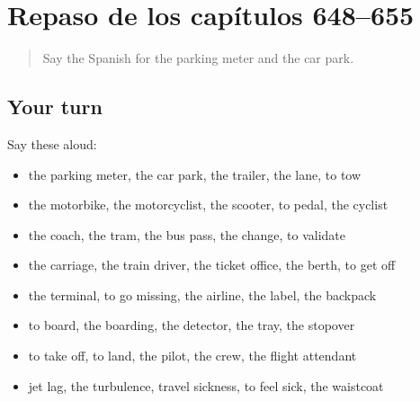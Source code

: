 \section[(dialogue)]{Repaso de los capítulos 648–655}

\label{lesson:ES-R655-repaso-648-655}



\begin{quote}
Say the Spanish for the parking meter and the car park.
\end{quote}

\subsection*{Your turn}
Say these aloud:

\begin{itemize}
\raggedright
  \item the parking meter, the car park, the trailer, the lane, to tow
  \item the motorbike, the motorcyclist, the scooter, to pedal, the cyclist
  \item the coach, the tram, the bus pass, the change, to validate
  \item the carriage, the train driver, the ticket office, the berth, to get off
  \item the terminal, to go missing, the airline, the label, the backpack
  \item to board, the boarding, the detector, the tray, the stopover
  \item to take off, to land, the pilot, the crew, the flight attendant
  \item jet lag, the turbulence, travel sickness, to feel sick, the waistcoat
\end{itemize}

